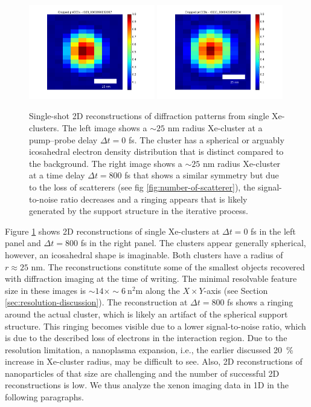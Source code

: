 \begin{figure}
	\centering
		\includegraphics[width=0.49\textwidth]{images/results/Xe_0_fs.png}
		\includegraphics[width=0.49\textwidth]{images/results/Xe_800_fs.png}
	\caption[Single-shot 2D reconstructions of $\sim 25$ nm radius Xe-clusters.]{Single-shot 2D reconstructions of diffraction patterns from single Xe-clusters. The left image shows a $\sim 25$ nm radius Xe-cluster at a pump--probe delay $\Delta t=0$ fs. The cluster has a spherical or arguably icosahedral electron density distribution that is distinct compared to the background. The right image shows a $\sim 25$ nm radius Xe-cluster at a time delay $\Delta t=800$ fs that shows a similar symmetry but due to the loss of scatterers (see fig \ref{fig:number-of-scatterer}), the signal-to-noise ratio decreases and a ringing appears that is likely generated by the support structure in the iterative process.}
	\label{fig:Xe-2D-reconstructions}
\end{figure}
Figure \ref{fig:Xe-2D-reconstructions} shows 2D reconstructions of single Xe-clusters at $\Delta t = 0$ fs in the left panel and $\Delta t=800$ fs in the right panel. The clusters appear generally spherical, however, an icosahedral shape is imaginable. Both clusters have a radius of $r\approx 25$ nm. The reconstructions constitute some of the smallest objects recovered with diffraction imaging at the time of writing. The minimal resolvable feature size in these images is $\sim 14\times \sim \SI{6}{\square\nano\meter}$ along the $X\times Y$-axis (see Section \ref{sec:resolution-discussion}). The reconstruction at $\Delta t=800$ fs shows a ringing around the actual cluster, which is likely an artifact of the spherical support structure. This ringing becomes visible due to a lower signal-to-noise ratio, which is due to the described loss of electrons in the interaction region. Due to the resolution limitation, a nanoplasma expansion, i.e., the earlier discussed \SI{20}{\percent} increase in Xe-cluster radius, may be difficult to see. Also, 2D reconstructions of nanoparticles of that size are challenging and the number of successful 2D reconstructions is low. We thus analyze the xenon imaging data in 1D in the following paragraphs.\\[1\baselineskip]
